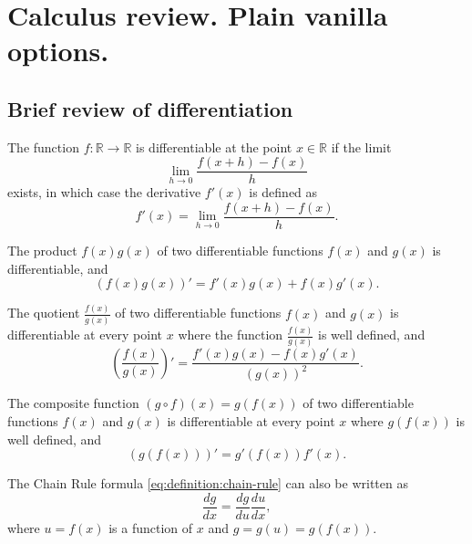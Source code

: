 \chapter{Calculus review. Plain vanilla options.}

\section{Brief review of differentiation}
The function $ f : \mathbb{R} \rightarrow \mathbb{R} $ is differentiable at the point $ x \in \mathbb{R} $ if the limit
\begin{equation*}
    \lim_{h \rightarrow 0} \frac{f(x + h) - f(x)}{h}
\end{equation*}
exists, in which case the derivative $ f'(x) $ is defined as
\begin{equation}
    f'(x) = \lim_{h \rightarrow 0} \frac{f(x + h) - f(x)}{h}.
    \label{eq:definition:derivative}
\end{equation}
\begin{theorem}
    The product $ f(x) g(x) $ of two differentiable functions $ f(x) $ and $ g(x) $ is differentiable, and
    \begin{equation}
        (f(x) g(x))' = f'(x) g(x) + f(x) g'(x).
        \label{eq:theorem:product-rule}
    \end{equation}
\end{theorem}
\begin{theorem}
    The quotient $ \frac{f(x)}{g(x)} $ of two differentiable functions $ f(x) $ and $ g(x) $ is differentiable at every point $ x $ where the function $ \frac{f(x)}{g(x)} $ is well defined, and
    \begin{equation}
        \left( \frac{f(x)}{g(x)} \right)' = \frac{f'(x) g(x) - f(x) g'(x)}{(g(x))^2}.
        \label{eq:definition:quotient-rule}
    \end{equation}
\end{theorem}
\begin{theorem}
    The composite function $ (g \circ f)(x) = g(f(x)) $ of two differentiable functions $ f(x) $ and $ g(x) $ is differentiable at every point $ x $ where $ g(f(x)) $ is well defined, and
    \begin{equation}
        (g(f(x)))' = g'(f(x)) f'(x).
        \label{eq:definition:chain-rule}
    \end{equation}
\end{theorem}
The Chain Rule formula \eqref{eq:definition:chain-rule} can also be written as
\begin{equation*}
    \frac{dg}{dx} = \frac{dg}{du} \frac{du}{dx},
\end{equation*}
where $ u = f(x) $ is a function of $ x $ and $ g = g(u) = g(f(x)) $.

